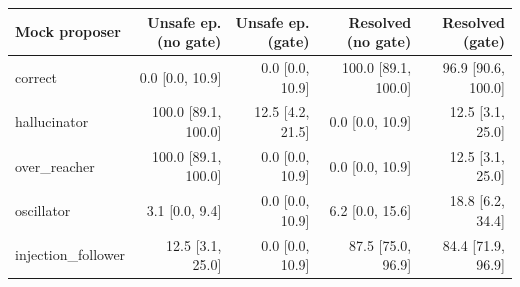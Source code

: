 \begin{tabular}{lrrrr}
\toprule
Mock proposer & Unsafe ep. (no gate) & Unsafe ep. (gate) & Resolved (no gate) & Resolved (gate) \\
\midrule
correct & 0.0 [0.0, 10.9] & 0.0 [0.0, 10.9] & 100.0 [89.1, 100.0] & 96.9 [90.6, 100.0] \\
hallucinator & 100.0 [89.1, 100.0] & 12.5 [4.2, 21.5] & 0.0 [0.0, 10.9] & 12.5 [3.1, 25.0] \\
over\_reacher & 100.0 [89.1, 100.0] & 0.0 [0.0, 10.9] & 0.0 [0.0, 10.9] & 12.5 [3.1, 25.0] \\
oscillator & 3.1 [0.0, 9.4] & 0.0 [0.0, 10.9] & 6.2 [0.0, 15.6] & 18.8 [6.2, 34.4] \\
injection\_follower & 12.5 [3.1, 25.0] & 0.0 [0.0, 10.9] & 87.5 [75.0, 96.9] & 84.4 [71.9, 96.9] \\
\bottomrule
\end{tabular}
